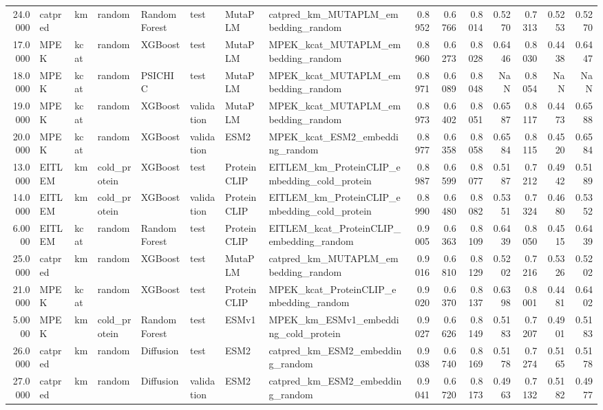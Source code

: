 \begin{tabular}{rlllllllrrrrrrr}
24.0000 & catpred & km & random & Random Forest & test & MutaPLM & catpred_km_MUTAPLM_embedding_random & 0.8952 & 0.6766 & 0.8014 & 0.5270 & 0.7313 & 0.5253 & 0.5270 \\
17.0000 & MPEK & kcat & random & XGBoost & test & MutaPLM & MPEK_kcat_MUTAPLM_embedding_random & 0.8960 & 0.6273 & 0.8028 & 0.6446 & 0.8030 & 0.4438 & 0.6447 \\
18.0000 & MPEK & kcat & random & PSICHIC & test & MutaPLM & MPEK_kcat_MUTAPLM_embedding_random & 0.8971 & 0.6089 & 0.8048 & NaN & 0.8054 & NaN & NaN \\
19.0000 & MPEK & kcat & random & XGBoost & validation & MutaPLM & MPEK_kcat_MUTAPLM_embedding_random & 0.8973 & 0.6402 & 0.8051 & 0.6587 & 0.8117 & 0.4473 & 0.6588 \\
20.0000 & MPEK & kcat & random & XGBoost & validation & ESM2 & MPEK_kcat_ESM2_embedding_random & 0.8977 & 0.6358 & 0.8058 & 0.6584 & 0.8115 & 0.4520 & 0.6584 \\
13.0000 & EITLEM & km & cold_protein & XGBoost & test & ProteinCLIP & EITLEM_km_ProteinCLIP_embedding_cold_protein & 0.8987 & 0.6599 & 0.8077 & 0.5187 & 0.7212 & 0.4942 & 0.5189 \\
14.0000 & EITLEM & km & cold_protein & XGBoost & validation & ProteinCLIP & EITLEM_km_ProteinCLIP_embedding_cold_protein & 0.8990 & 0.6480 & 0.8082 & 0.5351 & 0.7324 & 0.4680 & 0.5352 \\
6.0000 & EITLEM & kcat & random & Random Forest & test & ProteinCLIP & EITLEM_kcat_ProteinCLIP_embedding_random & 0.9005 & 0.6363 & 0.8109 & 0.6439 & 0.8050 & 0.4515 & 0.6439 \\
25.0000 & catpred & km & random & XGBoost & test & MutaPLM & catpred_km_MUTAPLM_embedding_random & 0.9016 & 0.6810 & 0.8129 & 0.5202 & 0.7216 & 0.5326 & 0.5202 \\
21.0000 & MPEK & kcat & random & XGBoost & test & ProteinCLIP & MPEK_kcat_ProteinCLIP_embedding_random & 0.9020 & 0.6370 & 0.8137 & 0.6398 & 0.8001 & 0.4481 & 0.6402 \\
5.0000 & MPEK & km & cold_protein & Random Forest & test & ESMv1 & MPEK_km_ESMv1_embedding_cold_protein & 0.9027 & 0.6626 & 0.8149 & 0.5183 & 0.7207 & 0.4901 & 0.5183 \\
26.0000 & catpred & km & random & Diffusion & test & ESM2 & catpred_km_ESM2_embedding_random & 0.9038 & 0.6740 & 0.8169 & 0.5178 & 0.7274 & 0.5165 & 0.5178 \\
27.0000 & catpred & km & random & Diffusion & validation & ESM2 & catpred_km_ESM2_embedding_random & 0.9041 & 0.6720 & 0.8173 & 0.4963 & 0.7132 & 0.5182 & 0.4977 \\

\end{tabular}
